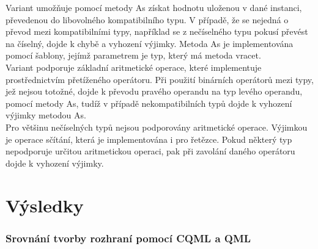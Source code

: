 \documentclass[report,11pt]{elsarticle}
\begin{document}
Variant umožňuje pomocí metody As získat hodnotu uloženou v dané instanci, převedenou do libovolného kompatibilního typu. V případě, že se nejedná o převod mezi kompatibilními typy, například se z nečíselného typu pokusí převést na číselný, dojde k chybě a vyhození výjimky.  Metoda As je implementována pomocí šablony, jejímž parametrem je typ, který má metoda vracet.\\
Variant podporuje základní aritmetické operace, které implementuje prostřednictvím přetíženého operátoru. 
Při použití binárních operátorů mezi typy, jež nejsou totožné, dojde k převodu pravého operandu na typ levého operandu, pomocí metody As, tudíž v případě nekompatibilních typů dojde k vyhození výjimky metodou As.\\
Pro většinu nečíselných typů nejsou podporovány aritmetické operace. Výjimkou je operace sčítání, která je implementována i pro řetězce. Pokud některý typ nepodporuje určitou aritmetickou operaci, pak při zavolání daného operátoru dojde k vyhození výjimky.\\


\part{\label{CH:conc}Výsledky}

\section{\label{SEC:Conclusion}Srovnání tvorby rozhraní pomocí CQML a QML}


\clearpage
\end{document}
